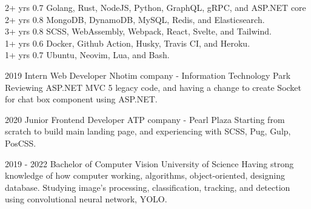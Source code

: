 \documentclass[10pt,A4]{article}
\begin{document}
\begin{paracol}{2}
\begin{leftcolumn}
 {2+ yrs} {0.7} {Golang, Rust, NodeJS, Python, GraphQL, gRPC, and ASP.NET core} \\[-2pt]

 {2+ yrs} {0.8} {MongoDB, DynamoDB, MySQL, Redis, and Elasticsearch.} \\[-2pt]

 {3+ yrs} {0.8} {SCSS, WebAssembly, Webpack, React, Svelte, and Tailwind.} \\[-2pt]

 {1+ yrs} {0.6} {Docker, Github Action, Husky, Travis CI, and Heroku.} \\[-2pt]

 {1+ yrs} {0.7} {Ubuntu, Neovim, Lua, and Bash.} \\[-2pt]

\end{leftcolumn}
\begin{rightcolumn}


\cvevent
	{2019}
	{Intern Web Developer}
	{Nhotim company - Information Technology Park}
	{Reviewing ASP.NET MVC 5 legacy code, and having a change to create Socket for chat box component using ASP.NET.}

\cvevent
	{2020}
	{Junior Frontend Developer}
	{ATP company - Pearl Plaza}
	{Starting from scratch to build main landing page, and experiencing with SCSS, Pug, Gulp, PosCSS.}

{}

\cvevent
	{2019 - 2022}
	{Bachelor of Computer Vision}
	{University of Science}
	{Having strong knowledge of how computer working, algorithms, object-oriented, designing database. Studying image's processing, classification, tracking, and detection using convolutional neural network, YOLO.}

{}


\end{rightcolumn}
\end{paracol}
\end{document}
